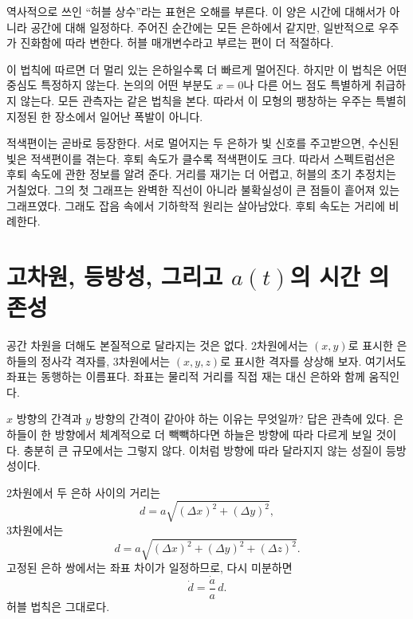 역사적으로 쓰인 ``허블 상수''라는 표현은 오해를 부른다. 이 양은 시간에 대해서가 아니라 공간에 대해 일정하다. 주어진 순간에는 모든 은하에서 같지만, 일반적으로 우주가 진화함에 따라 변한다. 허블 매개변수라고 부르는 편이 더 적절하다.

이 법칙에 따르면 더 멀리 있는 은하일수록 더 빠르게 멀어진다. 하지만 이 법칙은 어떤 중심도 특정하지 않는다. 논의의 어떤 부분도 \(x=0\)나 다른 어느 점도 특별하게 취급하지 않는다. 모든 관측자는 같은 법칙을 본다. 따라서 이 모형의 팽창하는 우주는 특별히 지정된 한 장소에서 일어난 폭발이 아니다.

적색편이는 곧바로 등장한다. 서로 멀어지는 두 은하가 빛 신호를 주고받으면, 수신된 빛은 적색편이를 겪는다. 후퇴 속도가 클수록 적색편이도 크다. 따라서 스펙트럼선은 후퇴 속도에 관한 정보를 알려 준다. 거리를 재기는 더 어렵고, 허블의 초기 추정치는 거칠었다. 그의 첫 그래프는 완벽한 직선이 아니라 불확실성이 큰 점들이 흩어져 있는 그래프였다. 그래도 잡음 속에서 기하학적 원리는 살아남았다. 후퇴 속도는 거리에 비례한다.

\begin{classroomqa}\end{classroomqa}

\section{고차원, 등방성, 그리고 \(a(t)\)의 시간 의존성}

공간 차원을 더해도 본질적으로 달라지는 것은 없다. 2차원에서는 \((x,y)\)로 표시한 은하들의 정사각 격자를, 3차원에서는 \((x,y,z)\)로 표시한 격자를 상상해 보자. 여기서도 좌표는 동행하는 이름표다. 좌표는 물리적 거리를 직접 재는 대신 은하와 함께 움직인다.

\(x\) 방향의 간격과 \(y\) 방향의 간격이 같아야 하는 이유는 무엇일까? 답은 관측에 있다. 은하들이 한 방향에서 체계적으로 더 빽빽하다면 하늘은 방향에 따라 다르게 보일 것이다. 충분히 큰 규모에서는 그렇지 않다. 이처럼 방향에 따라 달라지지 않는 성질이 등방성이다.

2차원에서 두 은하 사이의 거리는
\begin{equation}
d=a\sqrt{(\Delta x)^2+(\Delta y)^2},
\end{equation}
3차원에서는
\begin{equation}
d=a\sqrt{(\Delta x)^2+(\Delta y)^2+(\Delta z)^2}.
\end{equation}
고정된 은하 쌍에서는 좌표 차이가 일정하므로, 다시 미분하면
\begin{equation}
\dot d=\frac{\dot a}{a}\,d.
\end{equation}
허블 법칙은 그대로다.

